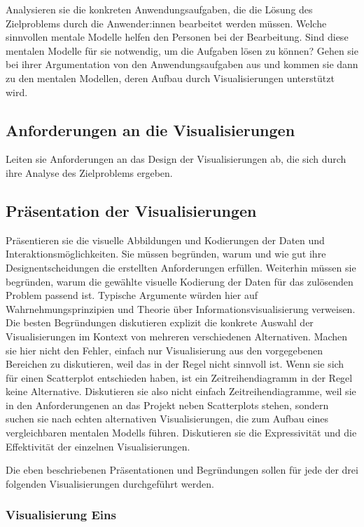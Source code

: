 \documentclass[usegeometry=true]{scrartcl}
\begin{document}
Analysieren sie die konkreten Anwendungsaufgaben, die die Lösung des Zielproblems durch die Anwender:innen bearbeitet werden müssen. 
Welche sinnvollen mentale Modelle helfen den Personen bei der Bearbeitung. 
Sind diese mentalen Modelle für sie notwendig, um die Aufgaben lösen zu können? Gehen sie bei ihrer Argumentation von den Anwendungsaufgaben aus und kommen sie dann zu den mentalen Modellen, deren Aufbau durch Visualisierungen unterstützt wird. 
\subsection{Anforderungen an die Visualisierungen}
Leiten sie Anforderungen an das Design der Visualisierungen ab, die sich durch ihre Analyse des Zielproblems ergeben.
\subsection{Präsentation der Visualisierungen}
Präsentieren sie die visuelle Abbildungen und Kodierungen der Daten und Interaktionsmöglichkeiten. 
Sie müssen  begründen, warum und wie gut ihre Designentscheidungen die erstellten Anforderungen erfüllen. 
Weiterhin müssen sie begründen, warum die gewählte visuelle Kodierung der Daten für das zulösenden Problem passend ist.
Typische Argumente würden hier auf Wahrnehmungsprinzipien und Theorie über Informationsvisualisierung verweisen. 
Die besten Begründungen diskutieren explizit die konkrete Auswahl der Visualisierungen im Kontext von mehreren verschiedenen Alternativen. 
Machen sie hier nicht den Fehler, einfach nur Visualisierung aus den vorgegebenen Bereichen zu diskutieren, weil das in der Regel nicht sinnvoll ist.
Wenn sie sich für einen Scatterplot entschieden haben, ist ein Zeitreihendiagramm in der Regel keine Alternative.
Diskutieren sie also nicht einfach Zeitreihendiagramme, weil sie in den Anforderungenen an das Projekt neben Scatterplots stehen, sondern suchen sie nach echten alternativen Visualisierungen, die zum Aufbau eines vergleichbaren mentalen Modells führen. 
Diskutieren sie die Expressivität und die Effektivität der einzelnen Visualisierungen. 

Die eben beschriebenen Präsentationen und Begründungen sollen für jede der drei folgenden Visualisierungen durchgeführt werden. 
\subsubsection{Visualisierung Eins}
\end{document}
